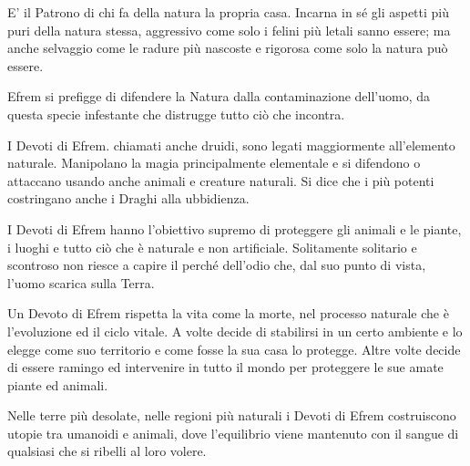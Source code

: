 \begin{multicols}{2}
E' il Patrono di chi fa della natura la propria casa. Incarna in sé gli aspetti più puri della natura stessa, aggressivo come solo i felini più letali sanno essere; ma anche selvaggio come le radure più nascoste e rigorosa come solo la natura può essere.

Efrem si prefigge di difendere la Natura dalla contaminazione dell'uomo, da questa specie infestante che distrugge tutto ciò che incontra.

I Devoti di Efrem. chiamati anche druidi, sono legati maggiormente all'elemento naturale. Manipolano la magia principalmente elementale e si difendono o attaccano usando anche animali e creature naturali. Si dice che i più potenti costringano anche i Draghi alla ubbidienza.

I Devoti di Efrem hanno l'obiettivo supremo di proteggere gli animali e le piante, i luoghi e tutto ciò che è naturale e non artificiale. Solitamente solitario e scontroso non riesce a capire il perché dell'odio che, dal suo punto di vista, l'uomo scarica sulla Terra.

Un Devoto di Efrem rispetta la vita come la morte, nel processo naturale che è l'evoluzione ed il ciclo vitale. A volte decide di stabilirsi in un certo ambiente e lo elegge come suo territorio e come fosse la sua casa lo protegge. Altre volte decide di essere ramingo ed intervenire in tutto il mondo per proteggere le sue amate piante ed animali.

Nelle terre più desolate, nelle regioni più naturali i Devoti di Efrem costruiscono utopie tra umanoidi e animali, dove l'equilibrio viene mantenuto con il sangue di qualsiasi che si ribelli al loro volere.


\end{multicols}
